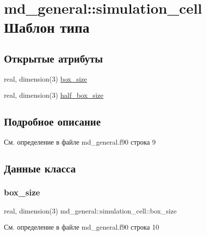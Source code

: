 \hypertarget{structmd__general_1_1simulation__cell}{}\section{md\+\_\+general\+:\+:simulation\+\_\+cell Шаблон типа}
\label{structmd__general_1_1simulation__cell}
\subsection*{Открытые атрибуты}
\begin{DoxyCompactItemize}
\item 
real, dimension(3) \mbox{\hyperlink{structmd__general_1_1simulation__cell_a0412f14df426d159b01c3e7d79d1f3d2}{box\+\_\+size}}
\item 
real, dimension(3) \mbox{\hyperlink{structmd__general_1_1simulation__cell_a3326fd3cbb92be765ba432cfb7acb693}{half\+\_\+box\+\_\+size}}
\end{DoxyCompactItemize}


\subsection{Подробное описание}


См. определение в файле md\+\_\+general.\+f90 строка 9



\subsection{Данные класса}
\mbox{\label{structmd__general_1_1simulation__cell_a0412f14df426d159b01c3e7d79d1f3d2}} 
\subsubsection{\texorpdfstring{box\+\_\+size}{box\_size}}
{\footnotesize\ttfamily real, dimension(3) md\+\_\+general\+::simulation\+\_\+cell\+::box\+\_\+size}



См. определение в файле md\+\_\+general.\+f90 строка 10


